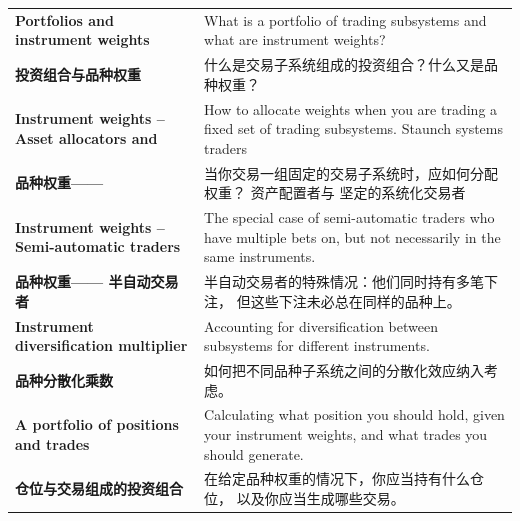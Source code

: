 \begin{bilingualtableblock} \begin{tabularx}{\textwidth}{@{} L{0.30\textwidth} Y@{}}\textbf{Portfolios and instrument weights} & What is a portfolio of trading subsystems and what are instrument weights? \\

\textbf{投资组合与品种权重} & 什么是交易子系统组成的投资组合？什么又是品种权重？ \\
\textbf{Instrument weights – Asset allocators and} & How to allocate weights when you are trading a fixed set of trading subsystems. Staunch systems traders \\
\textbf{品种权重——} & 当你交易一组固定的交易子系统时，应如何分配权重？ 资产配置者与 坚定的系统化交易者 \\
\textbf{Instrument weights – Semi-automatic traders} & The special case of semi-automatic traders who have multiple bets on, but not necessarily in the same instruments. \\
\textbf{品种权重—— 半自动交易者} & 半自动交易者的特殊情况：他们同时持有多笔下注， 但这些下注未必总在同样的品种上。 \\
\textbf{Instrument diversification multiplier} & Accounting for diversification between subsystems for different instruments. \\
\textbf{品种分散化乘数} & 如何把不同品种子系统之间的分散化效应纳入考虑。 \\
\textbf{A portfolio of positions and trades} & Calculating what position you should hold, given your instrument weights, and what trades you should generate. \\
\textbf{仓位与交易组成的投资组合} & 在给定品种权重的情况下，你应当持有什么仓位， 以及你应当生成哪些交易。 \\
\end{tabularx}
\end{bilingualtableblock}



